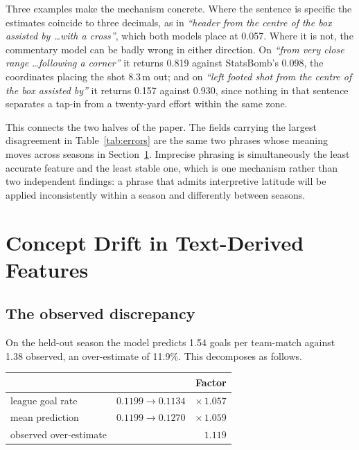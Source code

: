 \documentclass[conference]{IEEEtran}
\newcommand{\num}[1]{\mbox{#1}}
\begin{document}
Three examples make the mechanism concrete. Where the sentence is specific the
estimates coincide to three decimals, as in \emph{``header from the centre of
the box assisted by \dots with a cross''}, which both models place at
\num{0.057}. Where it is not, the commentary model can be badly wrong in either
direction. On \emph{``from very close range \dots following a corner''} it
returns \num{0.819} against StatsBomb's \num{0.098}, the coordinates placing
the shot \num{8.3}\,m out; and on \emph{``left footed shot from the centre of
the box assisted by''} it returns \num{0.157} against \num{0.930}, since
nothing in that sentence separates a tap-in from a twenty-yard effort within
the same zone.

This connects the two halves of the paper. The fields carrying the largest
disagreement in Table~\ref{tab:errors} are the same two phrases whose meaning
moves across seasons in Section~\ref{sec:drift}. Imprecise phrasing is
simultaneously the least accurate feature and the least stable one, which is
one mechanism rather than two independent findings: a phrase that admits
interpretive latitude will be applied inconsistently within a season and
differently between seasons.

\section{Concept Drift in Text-Derived Features}
\label{sec:drift}

\subsection{The observed discrepancy}

On the held-out season the model predicts \num{1.54} goals per team-match
against \num{1.38} observed, an over-estimate of 11.9\%. This decomposes as
follows.

\begin{center}
\begin{tabular}{lcr}
\toprule
& & Factor \\
\midrule
league goal rate & $0.1199 \to 0.1134$ & $\times\,1.057$ \\
mean prediction & $0.1199 \to 0.1270$ & $\times\,1.059$ \\
\midrule
observed over-estimate & & $1.119$ \\
\bottomrule
\end{tabular}
\end{center}
\end{document}
